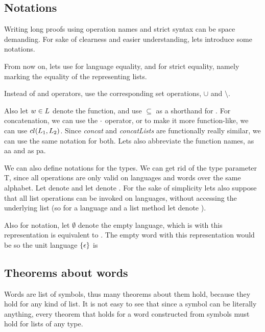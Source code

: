 \subsection{Notations}

Writing long proofs using operation names and strict syntax can be space demanding. For sake of clearness and easier understanding, lets introduce some notations.

From now on, lets use \inline{==} for language equality, and \inline{===} for strict equality, namely marking the equality of the representing lists.

Instead of \inline{++} and \inline{--} operators, use the corresponding set operations, $\cup$ and $\setminus$.

Also let $w \in L$ denote the  function, and use $\subseteq$ as a shorthand for . For concatenation, we can use the $\cdot$ operator, or to make it more function-like, we can use $cl(L_{1} , L_{2})$. Since \emph{concat} and \emph{concatLists} are functionally really similar, we can use the same notation for both. Lets also abbreviate the function names,  as aa and  as pa.

We can also define notations for the types. We can get rid of the type parameter T, since all operations are only valid on languages and words over the same alphabet. Let  denote  and let  denote . For the sake of simplicity lets also suppose that all list operations can be invoked on languages, without accessing the underlying list (so for a language  and a list method  let  denote ).

Also for notation, let $\emptyset$ denote the empty language, which is with this representation is equivalent to . The empty word with this representation would be  so the unit language $\{\epsilon\}$ is 

\subsection{Theorems about words}

Words are list of symbols, thus many theorems about them hold, because they hold for any kind of list. It is not easy to see that since a symbol can be literally anything, every theorem that holds for a word constructed from symbols must hold for lists of any type.

